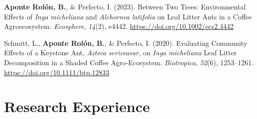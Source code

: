 \documentclass[11pt,a4paper,]{awesome-cv}
\begin{document}
\hypertarget{bibliography}{}
\leavevmode{}%
\textbf{Aponte Rolón, B.}, \& Perfecto, I. (2023). Between Two Trees:
Environmental Effects of \emph{Inga micheliana} and
\emph{Alchornea latifolia} on Leaf Litter Ants in a Coffee
Agroecosystem. \emph{Ecosphere}, \emph{14}(2), e4442.
\url{https://doi.org/10.1002/ecs2.4442}

\leavevmode{}%
Schmitt, L., \textbf{Aponte Rolón, B.}, \& Perfecto, I. (2020).
Evaluating Community Effects of a Keystone Ant,
\emph{Azteca sericeasur,} on \emph{Inga micheliana} Leaf Litter
Decomposition in a Shaded Coffee Agro-Ecosystem. \emph{Biotropica},
\emph{52}(6), 1253--1261. \url{https://doi.org/10.1111/btp.12833}

\hypertarget{research-experience}{%
\section{Research Experience}\label{research-experience}}
\end{document}
